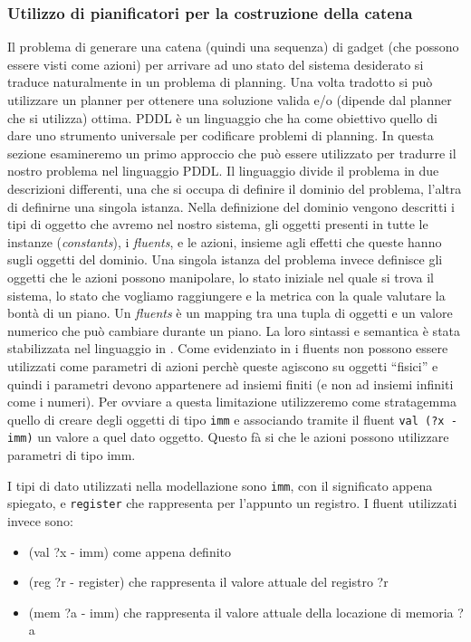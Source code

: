\subsubsection{Utilizzo di pianificatori per la costruzione della
  catena}
\label{sec:pddl}

Il problema di generare una catena (quindi una sequenza) di gadget
(che possono essere visti come azioni) per arrivare ad uno stato del
sistema desiderato si traduce naturalmente in un problema di
planning. Una volta tradotto si può utilizzare un planner per ottenere
una soluzione valida e/o (dipende dal planner che si utilizza)
ottima. PDDL è un linguaggio che ha come obiettivo quello di dare uno
strumento universale per codificare problemi di planning.  In questa
sezione esamineremo un primo approccio che può essere utilizzato per
tradurre il nostro problema nel linguaggio PDDL. Il linguaggio divide
il problema in due descrizioni differenti, una che si occupa di
definire il dominio del problema, l'altra di definirne una singola
istanza. Nella definizione del dominio vengono descritti i tipi di
oggetto che avremo nel nostro sistema, gli oggetti presenti in tutte
le instanze (\emph{constants}), i \emph{fluents}, e le azioni, insieme
agli effetti che queste hanno sugli oggetti del dominio. Una singola
istanza del problema invece definisce gli oggetti che le azioni
possono manipolare, lo stato iniziale nel quale si trova il sistema,
lo stato che vogliamo raggiungere e la metrica con la quale valutare
la bontà di un piano. Un \emph{fluents} è un mapping tra una tupla di
oggetti e un valore numerico che può cambiare durante un piano. La
loro sintassi e semantica è stata stabilizzata nel linguaggio in
\cite{fox-03}. Come evidenziato in \cite{fox-03} i fluents non possono
essere utilizzati come parametri di azioni perchè queste agiscono su
oggetti ``fisici'' e quindi i parametri devono appartenere ad insiemi
finiti (e non ad insiemi infiniti come i numeri). Per ovviare a questa
limitazione utilizzeremo come stratagemma quello di creare degli
oggetti di tipo \lstinline{imm} e associando tramite il fluent
\lstinline{val (?x - imm)} un valore a quel dato oggetto. Questo fà si
che le azioni possono utilizzare parametri di tipo imm.  

I tipi di dato utilizzati nella modellazione sono \lstinline{imm}, con
il significato appena spiegato, e \lstinline{register} che rappresenta
per l'appunto un registro. I fluent utilizzati invece sono:

\begin{itemize}
\item (val ?x - imm) come appena definito
\item (reg ?r - register) che rappresenta il valore attuale del
  registro ?r
\item (mem ?a - imm) che rappresenta il valore attuale della locazione
  di memoria ?a
\end{itemize}

